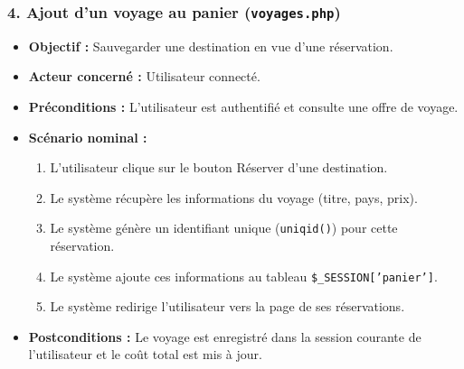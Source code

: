 \documentclass[a4paper,12pt]{article}
\begin{document}
\subsubsection*{4. Ajout d'un voyage au panier (\texttt{voyages.php})}
\begin{itemize}[label=\textbullet]
    \item \textbf{Objectif :} Sauvegarder une destination en vue d'une réservation.
    \item \textbf{Acteur concerné :} Utilisateur connecté.
    \item \textbf{Préconditions :} L'utilisateur est authentifié et consulte une offre de voyage.
    \item \textbf{Scénario nominal :}
    \begin{enumerate}[label=\arabic*.]
        \item L'utilisateur clique sur le bouton \og Réserver \fg{} d'une destination.
        \item Le système récupère les informations du voyage (titre, pays, prix).
        \item Le système génère un identifiant unique (\texttt{uniqid()}) pour cette réservation.
        \item Le système ajoute ces informations au tableau \texttt{\$\_SESSION['panier']}.
        \item Le système redirige l'utilisateur vers la page de ses réservations.
    \end{enumerate}
    \item \textbf{Postconditions :} Le voyage est enregistré dans la session courante de l'utilisateur et le coût total est mis à jour.
\end{itemize}

\vspace{0.3cm}

\end{document}
